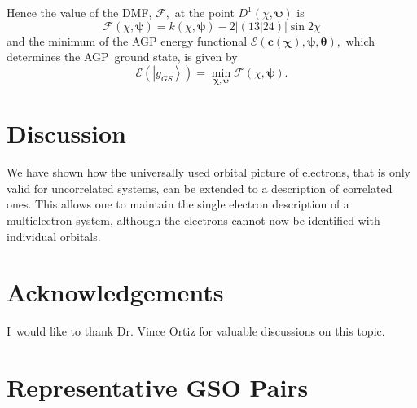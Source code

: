\documentclass[aps,preprint]{revtex4}%
\begin{document}
Hence the value of the DMF, $\mathcal{F},$ at the point $D^{1}\left(
\chi,\boldsymbol{\psi}\right)  $ is%
\begin{equation}
\mathcal{F}\left(  \chi,\boldsymbol{\psi}\right)  =k\left(  \chi
,\boldsymbol{\psi}\right)  -2\left\vert \left(  \left.  13\right\vert
24\right)  \right\vert \sin2\chi
\end{equation}
and the minimum of the AGP energy functional $\mathcal{E}\left(
\boldsymbol{c}\left(  \boldsymbol{\chi}\right)  ,\boldsymbol{\psi,\theta
}\right)  ,$ which determines the AGP\ ground state, is given by
\begin{equation}
\mathcal{E}\left(  \left\vert g_{GS}\right\rangle \right)  =\min
_{\boldsymbol{\chi,\psi}}\mathcal{F}\left(  \chi,\boldsymbol{\psi}\right)  .
\end{equation}


\section{Discussion}

We have shown how the universally used orbital picture of electrons, that is
only valid for uncorrelated systems, can be extended to a description of
correlated ones. This allows one to maintain the single electron description
of a multielectron system, although the electrons cannot now be identified
with individual orbitals. 

\section{Acknowledgements}

I\ would like to thank Dr. Vince Ortiz for valuable discussions on this topic.

\appendix


\section{Representative GSO Pairs\label{GSOpairs}}
\end{document}
